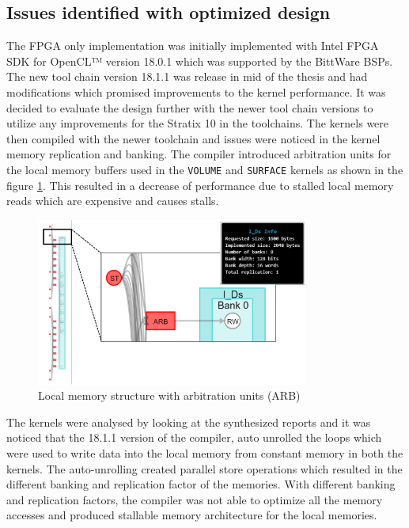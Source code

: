 \subsection{Issues identified with optimized design}

The FPGA only implementation was initially implemented with Intel FPGA
SDK for OpenCL™ version 18.0.1 which was supported by the BittWare
BSPs. The new tool chain version 18.1.1 was release in mid of the thesis
and had modifications which promised improvements to the kernel performance.
It was decided to evaluate the design further with the newer tool chain versions to
utilize any improvements for the Stratix 10 in the toolchains.
The kernels were then compiled with the newer toolchain and issues
were noticed in the kernel memory replication and banking. The
compiler introduced arbitration units for the local memory
buffers used in the \texttt{VOLUME} and \texttt{SURFACE} kernels
as shown in the figure \ref{fig:arb}. This resulted in a decrease
of performance due to stalled local memory reads which are expensive
and causes stalls.

\begin{figure}[ht]%
    \centering
    \includegraphics[width=0.8\textwidth]{images/arb}
    \caption{Local memory structure with arbitration units (ARB)}
    \label{fig:arb}
\end{figure}

The kernels were analysed by looking at the synthesized reports and it was noticed that
the 18.1.1 version of the compiler, auto unrolled the loops which were used
to write data into the local memory from constant memory in both the kernels.
The auto-unrolling created parallel store operations which resulted in the
different banking and replication factor of the memories. With different
banking and replication factors, the compiler was not able to optimize
all the memory accesses and produced stallable memory architecture for the
local memories.


